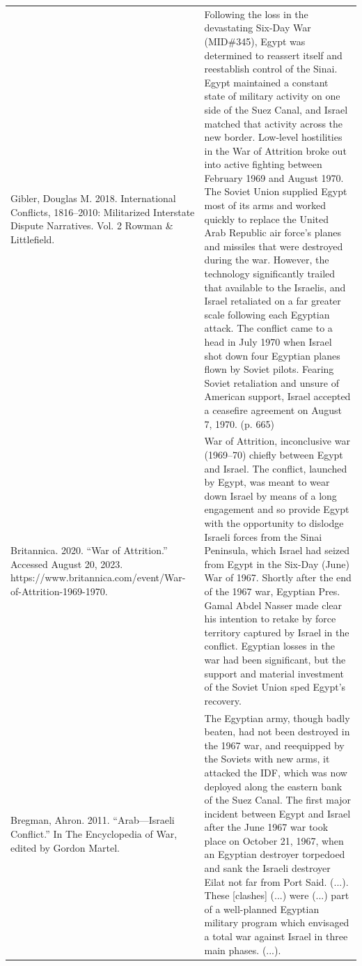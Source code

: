 {\begin{longtable}{p{}p{}}
Gibler, Douglas M. 2018. International Conflicts, 1816–2010: Militarized Interstate Dispute Narratives. Vol. 2 Rowman \& Littlefield. & Following the loss in the devastating Six-Day War (MID\#345), Egypt was determined to reassert itself and reestablish control of the Sinai. Egypt maintained a constant state of military activity on one side of the Suez Canal, and Israel matched that activity across the new border. Low-level hostilities in the War of Attrition broke out into active fighting between February 1969 and August 1970. The Soviet Union supplied Egypt most of its arms and worked quickly to replace the United Arab Republic air force's planes and missiles that were destroyed during the war. However, the technology significantly trailed that available to the Israelis, and Israel retaliated on a far greater scale following each Egyptian attack. The conflict came to a head in July 1970 when Israel shot down four Egyptian planes flown by Soviet pilots. Fearing Soviet retaliation and unsure of American support, Israel accepted a ceasefire agreement on August 7, 1970. (p. 665)
\\
Britannica. 2020. “War of Attrition.” Accessed August 20, 2023. https://www.britannica.com/event/War-of-Attrition-1969-1970. & War of Attrition, inconclusive war (1969–70) chiefly between Egypt and Israel. The conflict, launched by Egypt, was meant to wear down Israel by means of a long engagement and so provide Egypt with the opportunity to dislodge Israeli forces from the Sinai Peninsula, which Israel had seized from Egypt in the Six-Day (June) War of 1967. Shortly after the end of the 1967 war, Egyptian Pres. Gamal Abdel Nasser made clear his intention to retake by force territory captured by Israel in the conflict. Egyptian losses in the war had been significant, but the support and material investment of the Soviet Union sped Egypt's recovery.
\\
Bregman, Ahron. 2011. “Arab—Israeli Conflict.” In The Encyclopedia of War, edited by Gordon Martel. & The Egyptian army, though badly beaten, had not been destroyed in the 1967 war, and reequipped by the Soviets with new arms, it attacked the IDF, which was now deployed along the eastern bank of the Suez Canal. The first major incident between Egypt and Israel after the June 1967 war took place on October 21, 1967, when an Egyptian destroyer torpedoed and sank the Israeli destroyer Eilat not far from Port Said. (...).
These [clashes] (...) were (...) part of a well-planned Egyptian military program which envisaged a total war against Israel in three main phases. (...).

\end{longtable}}
